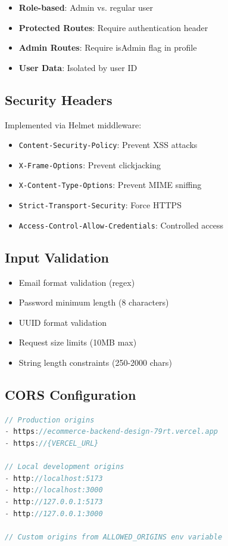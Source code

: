 \documentclass[12pt,a4paper]{report}
\begin{document}
\begin{itemize}
    \item \textbf{Role-based}: Admin vs. regular user
    \item \textbf{Protected Routes}: Require authentication header
    \item \textbf{Admin Routes}: Require isAdmin flag in profile
    \item \textbf{User Data}: Isolated by user ID
\end{itemize}

\subsection{Security Headers}

Implemented via Helmet middleware:
\begin{itemize}
    \item \texttt{Content-Security-Policy}: Prevent XSS attacks
    \item \texttt{X-Frame-Options}: Prevent clickjacking
    \item \texttt{X-Content-Type-Options}: Prevent MIME sniffing
    \item \texttt{Strict-Transport-Security}: Force HTTPS
    \item \texttt{Access-Control-Allow-Credentials}: Controlled access
\end{itemize}

\subsection{Input Validation}

\begin{itemize}
    \item Email format validation (regex)
    \item Password minimum length (8 characters)
    \item UUID format validation
    \item Request size limits (10MB max)
    \item String length constraints (250-2000 chars)
\end{itemize}

\subsection{CORS Configuration}

\begin{lstlisting}[language=javascript, caption=CORS Setup]
// Production origins
- https://ecommerce-backend-design-79rt.vercel.app
- https://{VERCEL_URL}

// Local development origins
- http://localhost:5173
- http://localhost:3000
- http://127.0.0.1:5173
- http://127.0.0.1:3000

// Custom origins from ALLOWED_ORIGINS env variable
\end{lstlisting}
\end{document}
